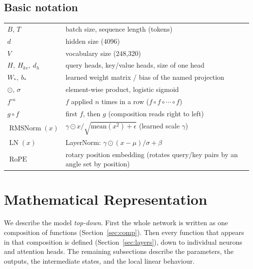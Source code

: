 \documentclass[10pt,a4paper]{article}
\newcommand{\op}[1]{\operatorname{#1}}
\theoremstyle{definition}
\begin{document}
\subsection*{Basic notation}
\begin{tabular}{ll}
\toprule
$B$, $T$ & batch size, sequence length (tokens) \\
$d$ & hidden size (4096) \\
$V$ & vocabulary size (248,320) \\
$H,\ H_{kv},\ d_h$ & query heads, key/value heads, size of one head \\
$W_\ast,\ b_\ast$ & learned weight matrix / bias of the named projection \\
$\odot$, $\sigma$ & element-wise product, logistic sigmoid \\
$f^{\circ n}$ & $f$ applied $n$ times in a row ($f\circ f\circ\cdots\circ f$) \\
$g \circ f$ & first $f$, then $g$ (composition reads right to left) \\
$\op{RMSNorm}(x)$ & $\gamma \odot x / \sqrt{\mathrm{mean}(x^2)+\epsilon}$ (learned scale $\gamma$) \\
$\op{LN}(x)$ & LayerNorm: $\gamma\odot(x-\mu)/\sigma + \beta$ \\
$\op{RoPE}$ & rotary position embedding (rotates query/key pairs by an angle set by position) \\
\bottomrule
\end{tabular}
\section{Mathematical Representation}\label{sec:func}
We describe the model \emph{top-down}. First the whole network is written as one composition of functions (Section~\ref{sec:comp}). Then every function that appears in that composition is defined (Section~\ref{sec:layers}), down to individual neurons and attention heads. The remaining subsections describe the parameters, the outputs, the intermediate states, and the local linear behaviour.
\end{document}
